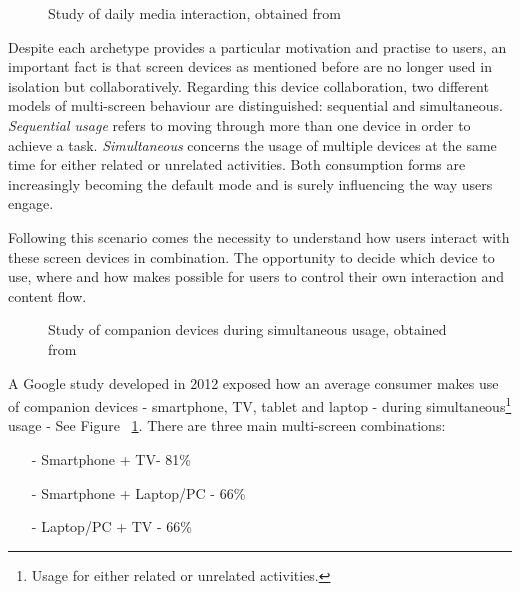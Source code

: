 \documentclass{acm_proc_article-sp}
\begin{document}
\begin{figure}[!htb]
\centering
{}
\caption{Study of daily media interaction, obtained from \cite{multiscreen:google}}
\end{figure}

Despite each archetype provides a particular motivation and practise to users, an important fact is that screen devices as mentioned before are no longer used in isolation but collaboratively. Regarding this device collaboration, two different models of multi-screen\cite{multiscreen:google} behaviour are distinguished:  sequential and simultaneous. \textit{Sequential usage} refers to moving through more than one device in order to achieve a task. \textit{Simultaneous} concerns the usage of multiple devices at the same time for either related or unrelated activities. Both consumption forms are increasingly becoming the default mode and is surely influencing the way users engage. 

Following this scenario comes the necessity to understand how users interact with these screen devices in combination\cite{hritzuk2014multiscreen}. The opportunity to decide which device to use, where and how makes possible for users to control their own interaction and content flow. 

\begin{figure}[!htb]
	\centering
	\caption{Study of companion devices during simultaneous	 usage, obtained from \cite{multiscreen:google}}
	\label{fig:simultaneous}
\end{figure}

A Google study developed in 2012 \cite{multiscreen:google} exposed how an average consumer makes use of companion devices - smartphone, TV, tablet and laptop - during simultaneous\footnote{Usage for either related or unrelated activities.} usage - See Figure ~\ref{fig:simultaneous}. There are three main multi-screen combinations:
\begin{itemize}
  \item[-] Smartphone + TV\hspace{1.35cm}- 81\% 
  \item[-] Smartphone + Laptop/PC \hspace{0.1cm}- 66\% 
  \item[-] Laptop/PC  + TV\hspace{1.35cm} - 66\% 
\end{itemize}
\end{document}
